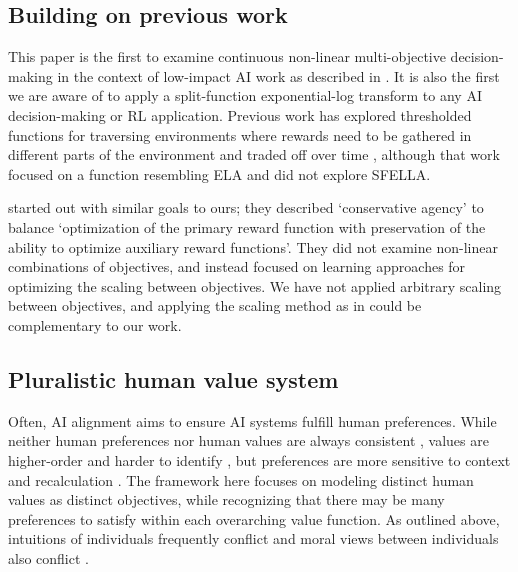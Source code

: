 

\subsection{Building on previous work}

This paper is the first to examine continuous non-linear multi-objective decision-making in the context of low-impact AI work as described in \cite{vamplew_potential-based_2021}. It is also the first we are aware of to apply a split-function exponential-log transform to any AI decision-making or RL application.  Previous work has explored thresholded functions for traversing environments where rewards need to be gathered in different parts of the environment and traded off over time \cite{rolf_need_2020}, although that work focused on a function resembling ELA and did not explore SFELLA. 

\cite{turner_conservative_2020} started out with similar goals to ours; they described `conservative agency' to balance `optimization of the primary reward function with preservation of the ability to optimize auxiliary reward functions'. They did not examine non-linear combinations of objectives, and instead focused on learning approaches for optimizing the scaling between objectives. We have not applied arbitrary scaling between objectives, and applying the scaling method as in \cite{turner_conservative_2020} could be complementary to our work.


\subsection{Pluralistic human value system}

Often, AI alignment aims to ensure AI systems fulfill human preferences. While neither human preferences nor human values are always consistent \cite{sotala2016defining}, values are higher-order and harder to identify \cite{barrett2008learning}, but preferences are more sensitive to context and recalculation \cite{warren2011values}. The framework here focuses on modeling distinct human values as distinct objectives, while recognizing that there may be many preferences to satisfy within each overarching value function. As outlined above, intuitions of individuals frequently conflict \cite{haidt2001emotional} and moral views between individuals also conflict \cite{bogosian_implementation_2017}.

